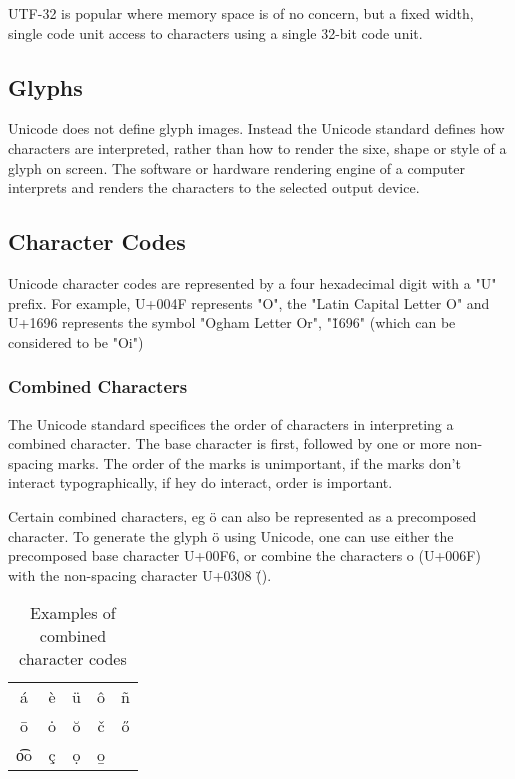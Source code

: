 UTF-32 is popular where memory space is of no concern, but a fixed
width, single code unit access to characters using a single 32-bit code
unit.

\subsection{Glyphs}

Unicode does not define glyph images. Instead the Unicode standard
defines how characters are interpreted, rather than how to render the
sixe, shape or style of a glyph on screen. The software or hardware 
rendering engine of a computer interprets and renders the characters to 
the selected output device.

\subsection{Character Codes}

Unicode character codes are represented by a four hexadecimal digit with
a "U" prefix. For example, U+004F represents "O", the "Latin Capital 
Letter O" and U+1696 represents the symbol "Ogham Letter Or", "\u1696"
(which can be considered to be "Oi")

\tofix

\subsubsection{Combined Characters}

The Unicode standard specifices the order of characters in interpreting 
a combined character. The base character is first, followed by one or
more non-spacing marks. The order of the marks is unimportant, if the 
marks don't interact typographically, if hey do interact, order is
important.


Certain combined characters, eg \"{o} can also be represented as a
precomposed character. To generate the glyph \"{o} using Unicode, one
can use either the precomposed base character U+00F6, or combine the
characters o (U+006F) with the non-spacing character U+0308 (\"{ }).

\begin{table}

\begin{center}

\begin{tabular}{ccccc}
\'{a}	&	\`{e}	&	\"{u}	&	\^{o}	&	\~{n}	\\
\={o}	&	\.{o}	&	\u{o}	&	\v{c}	&	\H{o}	\\
\t{oo}&	\c{c}	&	\d{o}	&	\b{o}	&			\\
\end{tabular}

\end{center}

\caption{Examples of combined character codes}

\end{table}

